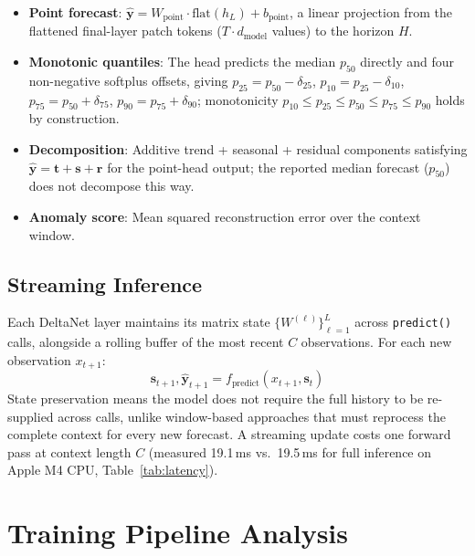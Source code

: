 \documentclass[11pt]{article}
\begin{document}
\begin{itemize}
\item \textbf{Point forecast}: $\hat{\mathbf{y}} = W_{\text{point}} \cdot \text{flat}(h_L) + b_{\text{point}}$, a linear projection from the flattened final-layer patch tokens ($T \cdot d_{\text{model}}$ values) to the horizon $H$.
\item \textbf{Monotonic quantiles}: The head predicts the median $p_{50}$ directly and four non-negative softplus offsets, giving $p_{25} = p_{50} - \delta_{25}$, $p_{10} = p_{25} - \delta_{10}$, $p_{75} = p_{50} + \delta_{75}$, $p_{90} = p_{75} + \delta_{90}$; monotonicity $p_{10} \leq p_{25} \leq p_{50} \leq p_{75} \leq p_{90}$ holds by construction.
\item \textbf{Decomposition}: Additive trend + seasonal + residual components satisfying $\hat{\mathbf{y}} = \mathbf{t} + \mathbf{s} + \mathbf{r}$ for the point-head output; the reported median forecast ($p_{50}$) does not decompose this way.
\item \textbf{Anomaly score}: Mean squared reconstruction error over the context window.
\end{itemize}

\subsection{Streaming Inference}
\label{sec:streaming}

Each DeltaNet layer maintains its matrix state $\{W^{(\ell)}\}_{\ell=1}^{L}$ across \texttt{predict()} calls, alongside a rolling buffer of the most recent $C$ observations. For each new observation $x_{t+1}$:
\begin{equation}
\mathbf{s}_{t+1}, \hat{\mathbf{y}}_{t+1} = f_{\text{predict}}(x_{t+1}, \mathbf{s}_t)
\label{eq:streaming}
\end{equation}
State preservation means the model does not require the full history to be re-supplied across calls, unlike window-based approaches that must reprocess the complete context for every new forecast. A streaming update costs one forward pass at context length $C$ (measured 19.1\,ms vs.\ 19.5\,ms for full inference on Apple M4 CPU, Table~\ref{tab:latency}).

\section{Training Pipeline Analysis}
\label{sec:pipeline}
\end{document}
